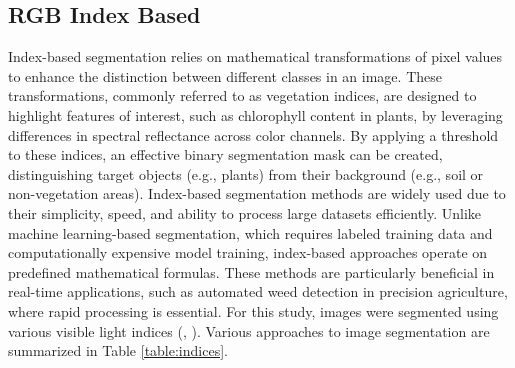\documentclass[letterpaper]{report}
\begin{document}
\subsection{RGB Index Based}
Index-based segmentation relies on mathematical transformations of pixel values to enhance the distinction between different classes in an image. These transformations, commonly referred to as vegetation indices, are designed to highlight features of interest, such as chlorophyll content in plants, by leveraging differences in spectral reflectance across color channels. By applying a threshold to these indices, an effective binary segmentation mask can be created, distinguishing target objects (e.g., plants) from their background (e.g., soil or non-vegetation areas). Index-based segmentation methods are widely used due to their simplicity, speed, and ability to process large datasets efficiently. Unlike machine learning-based segmentation, which requires labeled training data and computationally expensive model training, index-based approaches operate on predefined mathematical formulas. These methods are particularly beneficial in real-time applications, such as automated weed detection in precision agriculture, where rapid processing is essential.
For this study, images were segmented using various visible light indices (\cite{Hunt2013-ih}, \cite{Hamuda2016-dw}).  Various approaches to image segmentation are  summarized in Table \ref{table:indices}.  
\end{document}

